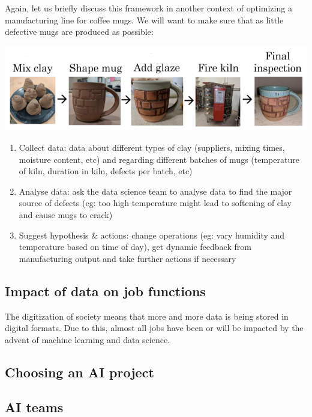 \documentclass{article}[a4paper,12pt]
\theoremstyle{definition}
\begin{document}
Again, let us briefly discuss this framework in another context of optimizing a manufacturing line for coffee mugs. We will want to make sure that as little defective mugs are produced as possible:
\begin{center}\includegraphics[scale=0.9]{manufacturing_steps.png}\end{center}
\begin{enumerate}
	\item Collect data: data about different types of clay (suppliers, mixing times, moisture content, etc) and regarding different batches of mugs (temperature of kiln, duration in kiln, defects per batch, etc)
 	\item Analyse data: ask the data science team to analyse data to find the major source of defects (eg: too high temperature might lead to softening of clay and cause mugs to crack)
	\item Suggest hypothesis \& actions: change operations (eg: vary humidity and temperature based on time of day), get dynamic feedback from manufacturing output and take further actions if necessary
\end{enumerate}
\subsection{Impact of data on job functions}
The digitization of society means that more and more data is being stored in digital formats. Due to this, almost all jobs have been or will be impacted by the advent of machine learning and data science.

\subsection{Choosing an AI project}


\subsection{AI teams}

\hrulefill
\end{document}
